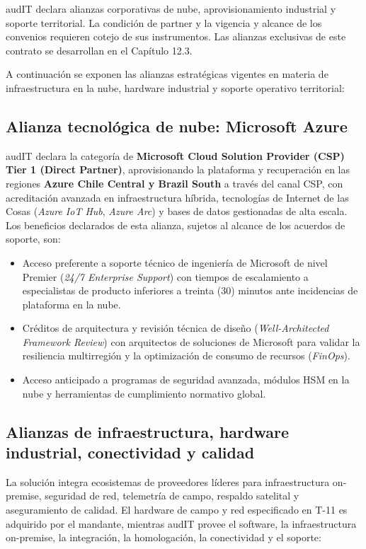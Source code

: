 audIT declara alianzas corporativas de nube, aprovisionamiento industrial y soporte territorial. La condición de partner y la vigencia y alcance de los convenios requieren cotejo de sus instrumentos. Las alianzas exclusivas de este contrato se desarrollan en el Capítulo 12.3.

A continuación se exponen las alianzas estratégicas vigentes en materia de infraestructura en la nube, hardware industrial y soporte operativo territorial:

\subsection{Alianza tecnológica de nube: Microsoft Azure}\label{sec:1-alianza-azure}

audIT declara la categoría de \textbf{Microsoft Cloud Solution Provider (CSP) Tier 1 (Direct Partner)}, aprovisionando la plataforma y recuperación en las regiones \textbf{Azure Chile Central y Brazil South} a través del canal CSP, con acreditación avanzada en infraestructura híbrida, tecnologías de Internet de las Cosas (\textit{Azure IoT Hub}, \textit{Azure Arc}) y bases de datos gestionadas de alta escala. Los beneficios declarados de esta alianza, sujetos al alcance de los acuerdos de soporte, son:

\begin{itemize}
  \item Acceso preferente a soporte técnico de ingeniería de Microsoft de nivel Premier (\textit{24/7 Enterprise Support}) con tiempos de escalamiento a especialistas de producto inferiores a treinta (30) minutos ante incidencias de plataforma en la nube.
  \item Créditos de arquitectura y revisión técnica de diseño (\textit{Well-Architected Framework Review}) con arquitectos de soluciones de Microsoft para validar la resiliencia multirregión y la optimización de consumo de recursos (\textit{FinOps}).
  \item Acceso anticipado a programas de seguridad avanzada, módulos HSM en la nube y herramientas de cumplimiento normativo global.
\end{itemize}

\subsection{Alianzas de infraestructura, hardware industrial, conectividad y calidad}\label{sec:1-alianza-hardware}

La solución integra ecosistemas de proveedores líderes para infraestructura on-premise, seguridad de red, telemetría de campo, respaldo satelital y aseguramiento de calidad. El hardware de campo y red especificado en T-11 es adquirido por el mandante, mientras audIT provee el software, la infraestructura on-premise, la integración, la homologación, la conectividad y el soporte:

